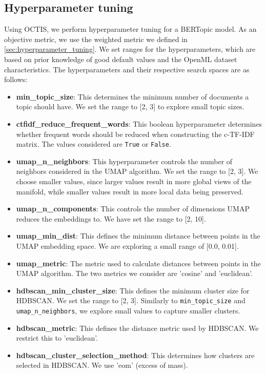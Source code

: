 \subsection{Hyperparameter tuning}
Using OCTIS, we perform hyperparameter tuning for a BERTopic model. As an objective metric, we use the weighted metric we defined in \cref{sec:hyperparameter_tuning}. We set ranges for the hyperparameters, which are based on prior knowledge of good default values and the OpenML dataset characteristics. The hyperparameters and their respective search spaces are as follows:

\begin{itemize}
    \item \textbf{min\_topic\_size}: This determines the minimum number of documents a topic should have. We set the range to [2, 3] to explore small topic sizes.
    \item \textbf{ctfidf\_reduce\_frequent\_words}: This boolean hyperparameter determines whether frequent words should be reduced when constructing the c-TF-IDF matrix. The values considered are \texttt{True} or \texttt{False}.
    \item \textbf{umap\_n\_neighbors}: This hyperparameter controls the number of neighbors considered in the UMAP algorithm. We set the range to [2, 3]. We choose smaller values, since larger values result in more global views of the manifold, while smaller values result in more local data being preserved.
    \item \textbf{umap\_n\_components}: This controls the number of dimensions UMAP reduces the embeddings to. We have set the range to [2, 10].
    \item \textbf{umap\_min\_dist}: This defines the minimum distance between points in the UMAP embedding space. We are exploring a small range of [0.0, 0.01].
    \item \textbf{umap\_metric}: The metric used to calculate distances between points in the UMAP algorithm. The two metrics we consider are 'cosine' and 'euclidean'.
    \item \textbf{hdbscan\_min\_cluster\_size}: This defines the minimum cluster size for HDBSCAN. We set the range to [2, 3]. Similarly to \texttt{min\_topic\_size} and \texttt{umap\_n\_neighbors}, we explore small values to capture smaller clusters.
    \item \textbf{hdbscan\_metric}: This defines the distance metric used by HDBSCAN. We restrict this to 'euclidean'.
    \item \textbf{hdbscan\_cluster\_selection\_method}: This determines how clusters are selected in HDBSCAN. We use 'eom' (excess of mass).

\end{itemize}
